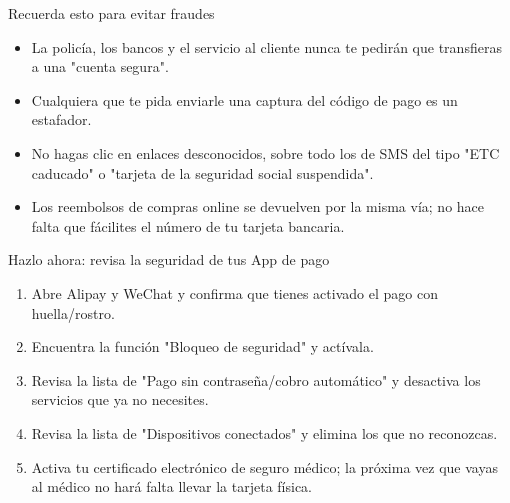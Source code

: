 \begin{tcbwarn}{Recuerda esto para evitar fraudes}
\begin{itemize}
  \item La policía, los bancos y el servicio al cliente nunca te pedirán que transfieras a una "cuenta segura".
  \item Cualquiera que te pida enviarle una captura del código de pago es un estafador.
  \item No hagas clic en enlaces desconocidos, sobre todo los de SMS del tipo "ETC caducado" o "tarjeta de la seguridad social suspendida".
  \item Los reembolsos de compras online se devuelven por la misma vía; no hace falta que fácilites el número de tu tarjeta bancaria.
\end{itemize}

\end{tcbwarn}

\begin{tcbpractice}{Hazlo ahora: revisa la seguridad de tus App de pago}
\begin{enumerate}
  \item Abre Alipay y WeChat y confirma que tienes activado el pago con huella/rostro.
  \item Encuentra la función "Bloqueo de seguridad" y actívala.
  \item Revisa la lista de "Pago sin contraseña/cobro automático" y desactiva los servicios que ya no necesites.
  \item Revisa la lista de "Dispositivos conectados" y elimina los que no reconozcas.
  \item Activa tu certificado electrónico de seguro médico; la próxima vez que vayas al médico no hará falta llevar la tarjeta física.
\end{enumerate}

\end{tcbpractice}
